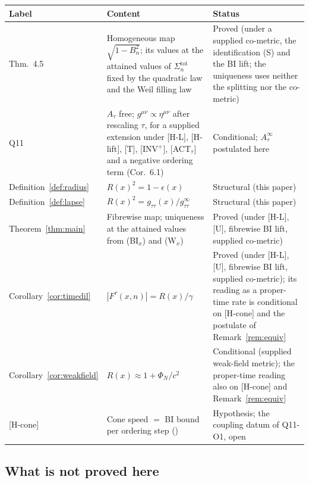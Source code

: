 \documentclass[11pt,a4paper]{article}
\begin{document}
    \begin{center}
      \renewcommand{\arraystretch}{1.2}
      \small
      \begin{tabular}{p{2.8cm}p{6.5cm}p{4.2cm}}
        \hline
        Label & Content & Status \\
        \hline
        \cite{Beau2026tp} Thm.~4.5 & Homogeneous map $\sqrt{1-B_n^2}$; its values at the attained values of
        $\Sigma_n^{\mathrm{tot}}$ fixed by the quadratic law and the Weil filling law &
        Proved (under a supplied co-metric, the identification (S) and the BI lift; the uniqueness uses neither
        the splitting nor the co-metric) \\
        Q11~\cite{Beau2026q11} & $A_\tau$ free; $g^{\mu\nu} \propto \eta^{\mu\nu}$ after rescaling $\tau$, for a
        supplied extension under [H-L], [H-lift], [T], [INV$^+$], [ACT$_\tau$] and a negative ordering term
        (Cor.~6.1) &
        Conditional; $A_\tau^\infty$ postulated here \\
        Definition~\ref{def:radius} & $R(x)^2 = 1-\epsilon(x)$ &
        Structural (this paper) \\
        Definition~\ref{def:lapse} & $R(x)^2 = g_{\tau\tau}(x)/g_{\tau\tau}^\infty$ &
        Structural (this paper) \\
        Theorem~\ref{thm:main} & Fibrewise map; uniqueness at the attained values from (BI$_x$) and (W$_x$) &
        Proved (under [H-L], [U], fibrewise BI lift, supplied co-metric) \\
        Corollary~\ref{cor:timedil} & $|F^\tau(x,n)| = R(x)/\gamma$ &
        Proved (under [H-L], [U], fibrewise BI lift, supplied co-metric); its reading as a proper-time rate
        is conditional on [H-cone] and the postulate of Remark~\ref{rem:equiv} \\
        Corollary~\ref{cor:weakfield} & $R(x) \approx 1+\Phi_N/c^2$ &
        Conditional (supplied weak-field metric); the proper-time reading also on [H-cone] and
        Remark~\ref{rem:equiv} \\
        {[H-cone]} & Cone speed $=$ BI bound per ordering step (\cite{Beau2026tp}) &
        Hypothesis; the coupling datum of Q11-O1, open \\
        \hline
      \end{tabular}
    \end{center}

  \subsection{What is not proved here}
\end{document}
